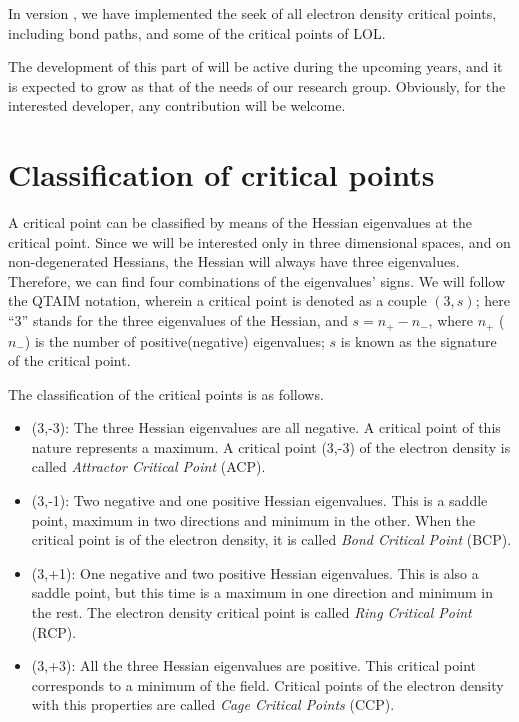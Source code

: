 In version \dtkversion, we have implemented the seek of all electron density critical points, including bond paths, and some of the critical points of LOL.

The development of this part of \DTK{} will be active during the upcoming years, and it is expected to grow as that of the needs of our research group. Obviously, for the interested developer, any contribution
will be welcome.

\section{Classification of critical points}

A critical point can be classified by means of the Hessian eigenvalues at the critical point.
Since we will be interested only in three dimensional spaces, and on non-degenerated Hessians,
the Hessian will always have three eigenvalues. Therefore, we can find four combinations of
the eigenvalues' signs. We will follow the QTAIM notation, wherein a critical point is
denoted as a couple $(3,s)$; here ``3'' stands for the three eigenvalues of the Hessian, and
$s=n_+-n_-$, where $n_+$ ($n_-$) is the number of positive(negative) eigenvalues; $s$ is
known as the signature of the critical point.

The classification of the critical points is as follows.
\begin{itemize}
   \item (3,-3): The three Hessian eigenvalues are all negative. A critical point of this nature represents a maximum. A critical point (3,-3) of the electron density is called \textit{Attractor Critical Point} (ACP).
   \item (3,-1): Two negative and one positive Hessian eigenvalues. This is a saddle point, maximum in two directions and minimum in the other. When the critical point is of the electron density, it is called \textit{Bond Critical Point} (BCP).
   \item (3,+1): One negative and two positive Hessian eigenvalues. This is also a saddle point, but this time is a maximum in one direction and minimum in the rest. The electron density critical point is called \textit{Ring Critical Point} (RCP).
   \item (3,+3): All the three Hessian eigenvalues are positive. This critical point corresponds to a minimum of the field. Critical points of the electron density with this properties are called \textit{Cage Critical Points} (CCP).
\end{itemize}

